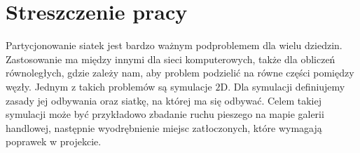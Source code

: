 \section{Streszczenie pracy}
Partycjonowanie siatek jest bardzo ważnym podproblemem dla wielu dziedzin.
Zastosowanie ma między innymi dla sieci komputerowych, także dla obliczeń równoległych, gdzie zależy nam,
aby problem podzielić na równe części pomiędzy węzły.
Jednym z takich problemów są symulacje $2$D.
Dla symulacji definiujemy zasady jej odbywania oraz siatkę, na której ma się odbywać.
Celem takiej symulacji może być przykładowo zbadanie ruchu pieszego na mapie galerii handlowej, następnie wyodrębnienie miejsc
zatłoczonych, które wymagają poprawek w projekcie.